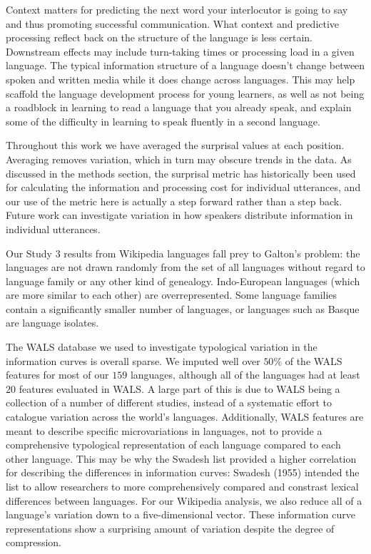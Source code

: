 \documentclass[man,floatsintext]{apa6}
\begin{document}
Context matters for predicting the next word your interlocutor is going to say and thus promoting successful communication. What context and predictive processing reflect back on the structure of the language is less certain. Downstream effects may include turn-taking times or processing load in a given language. The typical information structure of a language doesn't change between spoken and written media while it does change across languages. This may help scaffold the language development process for young learners, as well as not being a roadblock in learning to read a language that you already speak, and explain some of the difficulty in learning to speak fluently in a second language.

Throughout this work we have averaged the surprisal values at each position. Averaging removes variation, which in turn may obscure trends in the data. As discussed in the methods section, the surprisal metric has historically been used for calculating the information and processing cost for individual utterances, and our use of the metric here is actually a step forward rather than a step back. Future work can investigate variation in how speakers distribute information in individual utterances.

Our Study 3 results from Wikipedia languages fall prey to Galton's problem: the languages are not drawn randomly from the set of all languages without regard to language family or any other kind of genealogy. Indo-European languages (which are more similar to each other) are overrepresented. Some language families contain a significantly smaller number of languages, or languages such as Basque are language isolates.

The WALS database we used to investigate typological variation in the information curves is overall sparse. We imputed well over \(50\%\) of the WALS features for most of our \(159\) languages, although all of the languages had at least \(20\) features evaluated in WALS. A large part of this is due to WALS being a collection of a number of different studies, instead of a systematic effort to catalogue variation across the world's languages. Additionally, WALS features are meant to describe specific microvariations in languages, not to provide a comprehensive typological representation of each language compared to each other language. This may be why the Swadesh list provided a higher correlation for describing the differences in information curves: Swadesh (1955) intended the list to allow researchers to more comprehensively compared and constrast lexical differences between languages. For our Wikipedia analysis, we also reduce all of a language's variation down to a five-dimensional vector. These information curve representations show a surprising amount of variation despite the degree of compression.
\end{document}
